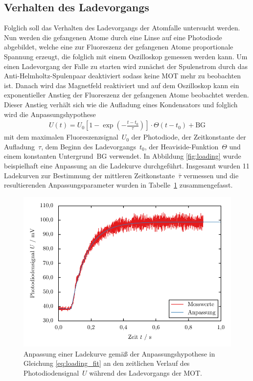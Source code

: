 \documentclass[11pt, a4paper]{article}
\numberwithin{equation}{section}
\begin{document}
\subsection{Verhalten des Ladevorgangs}
Folglich soll das Verhalten des Ladevorgangs der Atomfalle untersucht werden.
Nun werden die gefangenen Atome durch eine Linse auf eine Photodiode abgebildet, welche eine zur Fluoreszenz der gefangenen Atome proportionale Spannung erzeugt, die folglich mit einem Oszilloskop gemessen werden kann.
Um einen Ladevorgang der Falle zu starten wird zunächst der Spulenstrom durch das Anti-Helmholtz-Spulenpaar deaktiviert sodass keine MOT mehr zu beobachten ist.
Danach wird das Magnetfeld reaktiviert und auf dem Oszilloskop kann ein exponentieller Anstieg der Fluoreszenz der gefangenen Atome beobachtet werden.
Dieser Anstieg verhält sich wie die Aufladung eines Kondensators und folglich wird die Anpassungshypothese
\begin{align}
	U(t) =  U_0 \left[ 1 - \exp\left( - \frac{t - t_0}{\tau} \right) \right] \cdot \Theta(t - t_0) + \mathrm{BG}
	\label{eq:loading_fit}
\end{align}
mit dem maximalen Fluoreszenzsignal~$U_0$ der Photodiode, der Zeitkonstante der Aufladung~$\tau$, dem Beginn des Ladevorgangs~$t_0$, der Heaviside-Funktion~$\Theta$ und einem konstanten Untergrund~$\mathrm{BG}$ verwendet.
In Abbildung \ref{fig:loading} wurde beispielhaft eine Anpassung an die Ladekurve durchgeführt.
Insgesamt wurden 11 Ladekurven zur Bestimmung der mittleren Zeitkonstante~$\bar{\tau}$ vermessen und die resultierenden Anpassungsparameter wurden in Tabelle~\ref{tab:loading_params} zusammengefasst.
\begin{figure}[htbp]
	\centering
	\includegraphics{./figures/loading/loading11.pdf}
	\caption{Anpassung einer Ladekurve gemäß der Anpassungshypothese in Gleichung \eqref{eq:loading_fit} an den zeitlichen Verlauf des Photodiodensignal~$U$ während des Ladevorgangs der MOT.}
	\label{fig:loading}
	
	\vspace{1cm}
	
	\resizebox{\textwidth}{!}{
		
	}
	\label{tab:loading_params}
\end{figure}
\end{document}
